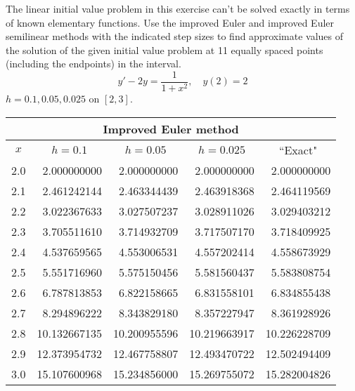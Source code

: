 \documentclass{ximera}
\begin{document}
\begin{problem}\label{exer:3.2.14} The linear initial value problem in this exercise can't be solved exactly in terms of known elementary functions. Use the improved Euler and improved Euler semilinear methods with the indicated step sizes to find approximate values of the solution of the given initial value problem at 11 equally spaced points (including the endpoints) in the interval.
$$y'-2y=\frac{1}{1+x^2},\quad y(2)=2$$
$h=0.1,0.05,0.025$ on $[2,3]$.

\begin{solution}
    {\small
\begin{tabular}{|c|r|r|r|r|}
\hline
\multicolumn{5}{|c|}{Improved Euler method}\\\hline
\multicolumn{1}{|c|}{$x$}&
\multicolumn{1}{|c|}{$h=0.1$}&
\multicolumn{1}{|c|}{$h=0.05$}&
\multicolumn{1}{|c|}{$h=0.025$}&
\multicolumn{1}{|c|}{``Exact"}\\ \hline
2.0 &  2.000000000 &  2.000000000 &  2.000000000 &  2.000000000 \\
2.1 &  2.461242144 &  2.463344439 &  2.463918368 &  2.464119569 \\
2.2 &  3.022367633 &  3.027507237 &  3.028911026 &  3.029403212 \\
2.3 &  3.705511610 &  3.714932709 &  3.717507170 &  3.718409925 \\
2.4 &  4.537659565 &  4.553006531 &  4.557202414 &  4.558673929 \\
2.5 &  5.551716960 &  5.575150456 &  5.581560437 &  5.583808754 \\
2.6 &  6.787813853 &  6.822158665 &  6.831558101 &  6.834855438 \\
2.7 &  8.294896222 &  8.343829180 &  8.357227947 &  8.361928926 \\
2.8 & 10.132667135 & 10.200955596 & 10.219663917 & 10.226228709 \\
2.9 & 12.373954732 & 12.467758807 & 12.493470722 & 12.502494409 \\
3.0 & 15.107600968 & 15.234856000 & 15.269755072 & 15.282004826 \\
\hline
\end{tabular}}


\end{solution}
\end{problem}
\end{document}
